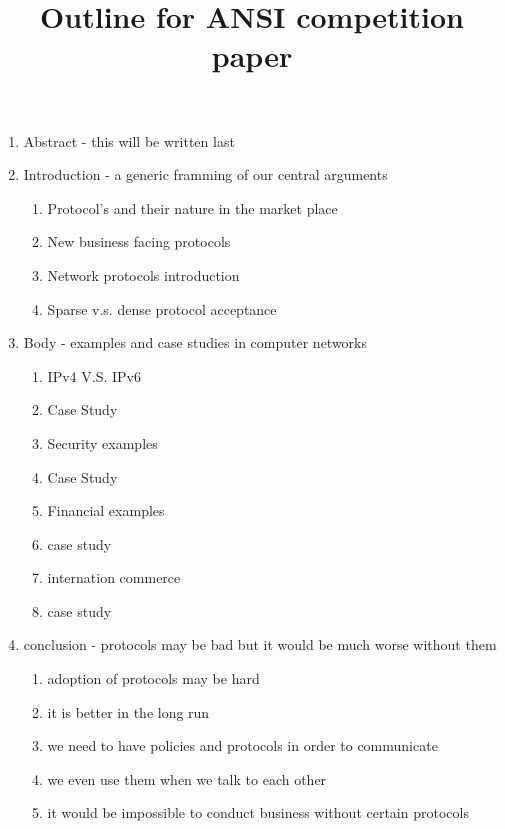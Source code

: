 \documentclass[]{article}
\begin{document}
	\title{Outline for ANSI competition paper}
	\maketitle
	\begin{enumerate}
		\item Abstract - this will be written last
		\item Introduction - a generic framming of our central arguments 
                  \begin{enumerate}
                    \item Protocol's and their nature in the market place 
                    \item New business facing protocols 
                    \item Network protocols introduction 
                    \item Sparse v.s. dense protocol acceptance 
                  \end{enumerate}
		\item Body - examples and case studies in computer networks 
                  \begin{enumerate}
                    \item IPv4 V.S. IPv6 
                    \item Case Study 
                    \item Security examples 
                    \item Case Study 
                    \item Financial examples 
                    \item case study
                    \item internation commerce 
                    \item case study
                  \end{enumerate}
		\item conclusion - protocols may be bad but it would be much worse without them 
                  \begin{enumerate}
                    \item adoption of protocols may be hard 
                    \item it is better in the long run 
                    \item we need to have policies and protocols in order to communicate 
                    \item we even use them when we talk to each other 
                    \item it would be impossible to conduct business without certain protocols 
                  \end{enumerate}
	\end{enumerate}
\end{document}
